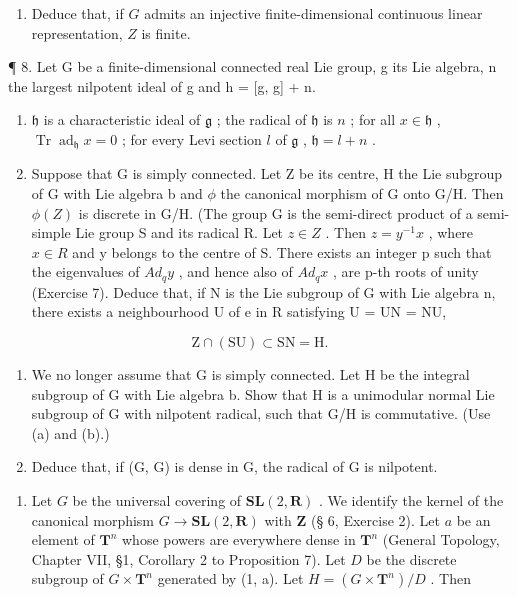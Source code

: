 \begin{enumerate}
\def\labelenumi{(\alph{enumi})}
\setcounter{enumi}{1}
\tightlist
\item
  Deduce that, if \(G\) admits an injective finite-dimensional continuous linear representation, \(Z\) is finite.
\end{enumerate}

¶ 8. Let G be a finite-dimensional connected real Lie group, g its Lie algebra, n the largest nilpotent ideal of g and h = {[}g, g{]} + n.

\begin{enumerate}
\def\labelenumi{(\alph{enumi})}
\item
  \(\mathfrak{h}\) is a characteristic ideal of \(\mathfrak{g}\) ; the radical of \(\mathfrak{h}\) is \(n\) ; for all \(x \in \mathfrak{h}\) , \(\operatorname{Tr} \operatorname{ad}_{\mathfrak{h}} x = 0\) ; for every Levi section \(l\) of \(\mathfrak{g}\) , \(\mathfrak{h} = l + n\) .
\item
  Suppose that G is simply connected. Let Z be its centre, H the Lie subgroup of G with Lie algebra b and \(\phi\) the canonical morphism of G onto G/H. Then \(\phi(Z)\) is discrete in G/H. (The group G is the semi-direct product of a semi-simple Lie group S and its radical R. Let \(z \in Z\) . Then \(z = y^{-1}x\) , where \(x \in R\) and y belongs to the centre of S. There exists an integer p such that the eigenvalues of \(Ad_{q}y\) , and hence also of \(Ad_{q}x\) , are p-th roots of unity (Exercise 7). Deduce that, if N is the Lie subgroup of G with Lie algebra n, there exists a neighbourhood U of e in R satisfying U = UN = NU,
\end{enumerate}

\[
\mathrm{Z} \cap (\mathrm{SU}) \subset \mathrm{SN} = \mathrm{H}.
\]

\begin{enumerate}
\def\labelenumi{(\alph{enumi})}
\setcounter{enumi}{2}
\item
  We no longer assume that G is simply connected. Let H be the integral subgroup of G with Lie algebra b. Show that H is a unimodular normal Lie subgroup of G with nilpotent radical, such that G/H is commutative. (Use (a) and (b).)
\item
  Deduce that, if (G, G) is dense in G, the radical of G is nilpotent.
\end{enumerate}

\begin{enumerate}
\def\labelenumi{\arabic{enumi}.}
\setcounter{enumi}{8}
\tightlist
\item
  Let \(G\) be the universal covering of \(\mathbf{SL}(2, \mathbf{R})\) . We identify the kernel of the canonical morphism \(G \to \mathbf{SL}(2, \mathbf{R})\) with \(\mathbf{Z}\) (§ 6, Exercise 2). Let \(a\) be an element of \(\mathbf{T}^n\) whose powers are everywhere dense in \(\mathbf{T}^n\) (General Topology, Chapter VII, §1, Corollary 2 to Proposition 7). Let \(D\) be the discrete subgroup of \(G \times \mathbf{T}^n\) generated by (1, a). Let \(H = (G \times \mathbf{T}^n)/D\) . Then
\end{enumerate}

